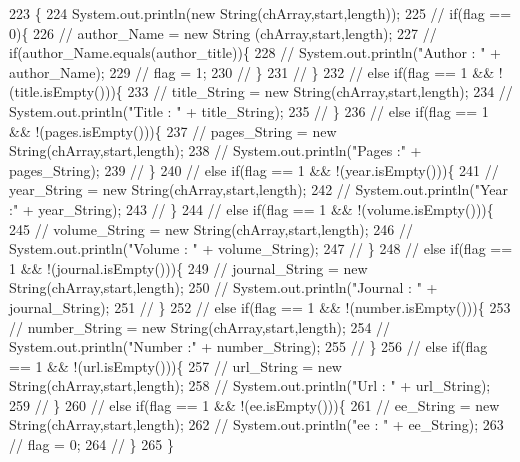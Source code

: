 \begin{DoxyCode}
223                                                                    \{
224         System.out.println(\textcolor{keyword}{new} String(chArray,start,length));
225             \textcolor{comment}{// if(flag == 0)\{}
226             \textcolor{comment}{//  author\_Name = new String (chArray,start,length);}
227             \textcolor{comment}{//  if(author\_Name.equals(author\_title))\{}
228             \textcolor{comment}{//      System.out.println("Author : " + author\_Name);}
229             \textcolor{comment}{//      flag = 1;}
230             \textcolor{comment}{//  \}}
231             \textcolor{comment}{// \}}
232             \textcolor{comment}{// else if(flag == 1 && !(title.isEmpty()))\{}
233             \textcolor{comment}{//  title\_String = new String(chArray,start,length);}
234             \textcolor{comment}{//  System.out.println("Title : " + title\_String);}
235             \textcolor{comment}{// \}}
236             \textcolor{comment}{// else if(flag == 1 && !(pages.isEmpty()))\{}
237             \textcolor{comment}{//  pages\_String = new String(chArray,start,length);}
238             \textcolor{comment}{//  System.out.println("Pages :" + pages\_String);}
239             \textcolor{comment}{// \}}
240             \textcolor{comment}{// else if(flag == 1 && !(year.isEmpty()))\{}
241             \textcolor{comment}{//  year\_String = new String(chArray,start,length);}
242             \textcolor{comment}{//  System.out.println("Year :" + year\_String);}
243             \textcolor{comment}{// \}}
244             \textcolor{comment}{// else if(flag == 1 && !(volume.isEmpty()))\{}
245             \textcolor{comment}{//  volume\_String = new String(chArray,start,length);}
246             \textcolor{comment}{//  System.out.println("Volume : " + volume\_String);}
247             \textcolor{comment}{// \}}
248             \textcolor{comment}{// else if(flag == 1 && !(journal.isEmpty()))\{}
249             \textcolor{comment}{//  journal\_String = new String(chArray,start,length);}
250             \textcolor{comment}{//  System.out.println("Journal : " + journal\_String);}
251             \textcolor{comment}{// \}}
252             \textcolor{comment}{// else if(flag == 1 && !(number.isEmpty()))\{}
253             \textcolor{comment}{//  number\_String = new String(chArray,start,length);}
254             \textcolor{comment}{//  System.out.println("Number :" + number\_String);}
255             \textcolor{comment}{// \}}
256             \textcolor{comment}{// else if(flag == 1 && !(url.isEmpty()))\{}
257             \textcolor{comment}{//  url\_String = new String(chArray,start,length);}
258             \textcolor{comment}{//  System.out.println("Url : " + url\_String);}
259             \textcolor{comment}{// \}}
260             \textcolor{comment}{// else if(flag == 1 && !(ee.isEmpty()))\{}
261             \textcolor{comment}{//  ee\_String = new String(chArray,start,length);}
262             \textcolor{comment}{//  System.out.println("ee : " + ee\_String);}
263             \textcolor{comment}{//  flag = 0;}
264             \textcolor{comment}{// \}}
265     \}
\end{DoxyCode}
